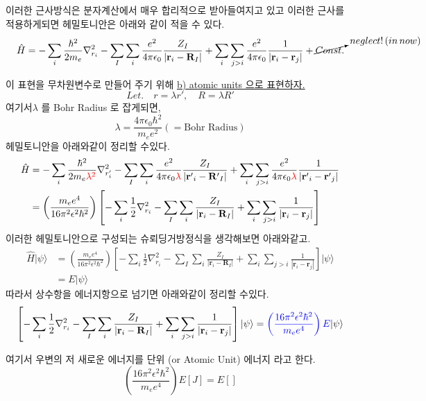 \documentclass[10pt]{article}
\begin{document}
\begin{enumerate}[label=3)]
\begin{enumerate}[label=\(\mathrm{i}\))]
\begin{tcolorbox}[enhanced, breakable, colback=gray!10, colframe=black, title=Definition: Born-oppenheimer Approximation]
\begin{minipage}[t]{0.48\textwidth}
\end{minipage}

\end{tcolorbox}

이러한 근사방식은 분자계산에서 매우 합리적으로 받아들여지고 있고 이러한 근사를 적용하게되면 헤밀토니안은 아래와 같이 적을 수 있다. 
\[
\hat{H} = -\sum_i \frac{\hbar^2}{2 m_e}\nabla_{r_i}^2 -  \sum_I \sum_i \frac{e^2}{4\pi \epsilon_0}\frac{Z_I}{|\mathbf{r}_i-\mathbf{R}_I|}
+ \sum_i \sum_{j>i} \frac{e^2}{4\pi \epsilon_0} \frac{1}{|\mathbf{r}_i - \mathbf{r}_j|} + \cancelto{neglect! \, (in \,now)}{Const.}
\]

이 표현을 무차원변수로 만들어 주기 위해 \underline{b) atomic units 으로 표현하자.} 
\[Let.\quad r=\lambda r', \quad R=\lambda R'\]
여기서\(\lambda\) 를 Bohr Radius 로 잡게되면,
\[\lambda=\frac{4\pi\epsilon_0\hbar^2}{m_ee^2} (=\text{Bohr Radius})\]
헤밀토니안을 아래와같이 정리할 수있다. 
\begin{align*}
\hat{H} &= -\sum_i \frac{\hbar^2}{2 m_e{\color{red} {\lambda^2}}}\nabla_{r_i'}^2 -  \sum_I \sum_i \frac{e^2}{4\pi \epsilon_0{\color{red} {\lambda}}}\frac{Z_I}{|\mathbf{r'}_i-\mathbf{R'}_I|}
+ \sum_i \sum_{j>i} \frac{e^2}{4\pi \epsilon_0{\color{red} {\lambda}}} \frac{1}{|\mathbf{r'}_i - \mathbf{r'}_j|} \\
&=\left(\frac{m_ee^4}{16\pi^2\epsilon^2\hbar^2}\right)\left[-\sum_i \frac{1}{2}\nabla_{r_i}^2 -  \sum_I \sum_i \frac{Z_I}{|\mathbf{r}_i-\mathbf{R}_I|}
+ \sum_i \sum_{j>i} \frac{1}{|\mathbf{r}_i - \mathbf{r}_j|}\right]
\end{align*}
이러한 헤밀토니안으로 구성되는 슈뢰딩거방정식을 생각해보면 아래와같고. 
\begin{align*}
\hat{H}\vert\psi\rangle &= \left(\frac{m_ee^4}{16\pi^2\epsilon^2\hbar^2}\right)\left[-\sum_i \frac{1}{2}\nabla_{r_i}^2 -  \sum_I \sum_i \frac{Z_I}{|\mathbf{r}_i-\mathbf{R}_I|}
+ \sum_i \sum_{j>i} \frac{1}{|\mathbf{r}_i - \mathbf{r}_j|}\right]\vert\psi\rangle\\
&=E\vert\psi\rangle
\end{align*}
따라서 상수항을 에너지항으로 넘기면 아래와같이 정리할 수있다. 
\[
\left[-\sum_i \frac{1}{2}\nabla_{r_i}^2 -  \sum_I \sum_i \frac{Z_I}{|\mathbf{r}_i-\mathbf{R}_I|}
+ \sum_i \sum_{j>i} \frac{1}{|\mathbf{r}_i - \mathbf{r}_j|}\right]\vert\psi\rangle = {\color{blue}\left(\frac{16\pi^2\epsilon^2\hbar^2}{m_ee^4}\right)E} \vert\psi\rangle
\]

여기서 우변의 저 새로운 에너지를  단위 (or Atomic Unit) 에너지 라고 한다. 
\[
\left(\frac{16\pi^2\epsilon^2\hbar^2}{m_ee^4}\right)E[J] = E[]
\]



\end{enumerate}
\end{enumerate}
\end{document}
